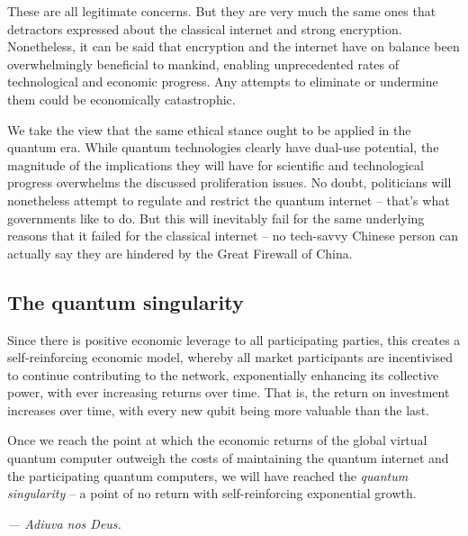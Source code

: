 \documentclass[aps, rmp, twocolumn, amsmath, amssymb, nofootinbib, superscriptaddress, longbibliography, floatfix, table-of-contents, eqsecnum]{revtex4-1}
\newcommand{\comment}[1]{{\color{blue}{\textbf{#1}}}}
\begin{document}

These are all legitimate concerns. But they are very much the same ones that detractors expressed about the classical internet and strong encryption. Nonetheless, it can be said that encryption and the internet have on balance been overwhelmingly beneficial to mankind, enabling unprecedented rates of technological and economic progress. Any attempts to eliminate or undermine them could be economically catastrophic.

We take the view that the same ethical stance ought to be applied in the quantum era. While quantum technologies clearly have dual-use potential, the magnitude of the implications they will have for scientific and technological progress overwhelms the discussed proliferation issues. No doubt, politicians will nonetheless attempt to regulate and restrict the quantum internet -- that's what governments like to do. But this will inevitably fail for the same underlying reasons that it failed for the classical internet -- no tech-savvy Chinese person can actually say they are hindered by the Great Firewall of China\texttrademark.

%
%

\subsection{The quantum singularity} \label{sec:singularity} 

Since there is positive economic leverage to all participating parties, this creates a self-reinforcing economic model, whereby all market participants are incentivised to continue contributing to the network, exponentially enhancing its collective power, with ever increasing returns over time. That is, the return on investment increases over time, with every new qubit being more valuable than the last.

Once we reach the point at which the economic returns of the global virtual quantum computer outweigh the costs of maintaining the quantum internet and the participating quantum computers, we will have reached the \textit{quantum singularity} -- a point of no return with self-reinforcing exponential growth.

\textit{--- Adiuva nos Deus.}

\comment{To do! talk about machine learning}

%
%
\end{document}
